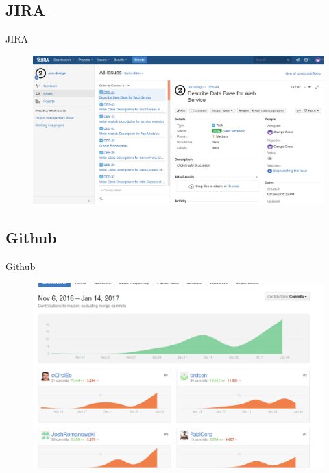\documentclass[19pt]{beamer}
\begin{document}
\subsection{JIRA}
\begin{frame}{JIRA}
	\begin{figure}
		\begin{center}
			\includegraphics[scale=0.25]{resources/jira_1.jpg} 
		\end{center}
	\end{figure}				
\end{frame}

\subsection{Github}
\begin{frame}{Github} %
	\begin{figure}
		\begin{center}
			\includegraphics[scale=0.27]{resources/github_stats_commits.png}
		\end{center}
	\end{figure}				
\end{frame}
\end{document}
